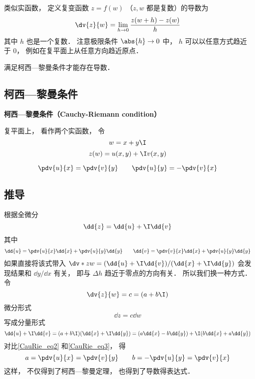 
类似实函数， 定义复变函数 $z = f(w)$ （$z, w$ 都是复数）的导数为
\begin{equation}
\dv{z}{w} = \lim_{h\to 0} \frac{z(w + h) - z(w)}{h}
\end{equation}
其中 $h$ 也是一个复数． 注意极限条件 $\abs{h}\to 0$ 中， $h$ 可以以任意方式趋近于 $0$， 例如在复平面上从任意方向趋近原点．

满足柯西—黎曼条件才能存在导数．

\subsection{柯西—黎曼条件}
\textbf{柯西—黎曼条件（Cauchy-Riemann condition）}

复平面上， 看作两个实函数， 令
\begin{equation}
w = x + y\I
\end{equation}
\begin{equation}
z(w) = u(x, y) + \I v(x, y)
\end{equation}

\begin{equation}\label{CauRie_eq1}
\pdv{u}{x} = \pdv{v}{y} \qquad
\pdv{u}{y} = - \pdv{v}{x}
\end{equation}


\subsection{推导}
根据全微分
\begin{equation}\label{CauRie_eq2}
\dd{z} = \dd{u} + \I \dd{v}
\end{equation}
其中
\begin{equation}\label{CauRie_eq3}
\dd{u} = \pdv{u}{x} \dd{x} + \pdv{u}{y} \dd{y} \qquad
\dd{v} = \pdv{v}{x} \dd{x} + \pdv{u}{y} \dd{y}
\end{equation}
如果直接将该式带入 $\dv*{z}{w} = (\dd{u} + \I \dd{v})/(\dd{x} + \I \dd{y})$ 会发现结果和 $\dd{y}/\dd{x}$ 有关， 即与 $\Delta h$ 趋近于零点的方向有关． 所以我们换一种方式． 令
\begin{equation}
\dv{z}{w} = c = (a + b\I)
\end{equation}
微分形式
\begin{equation}
\dd{z} = c\dd{w}
\end{equation}
写成分量形式
\begin{equation}
\dd{u} + \I \dd{v} = (a + b\I)(\dd{x} + \I\dd{y}) = (a \dd{x} - b\dd{y}) + \I (b \dd{x} + a\dd{y})
\end{equation}
对比\autoref{CauRie_eq2} 和\autoref{CauRie_eq3}， 得
\begin{equation}
a = \pdv{u}{x} = \pdv{v}{y} \qquad
b = -\pdv{u}{y} = \pdv{v}{x}
\end{equation}
这样， 不仅得到了柯西—黎曼定理， 也得到了导数得表达式．

